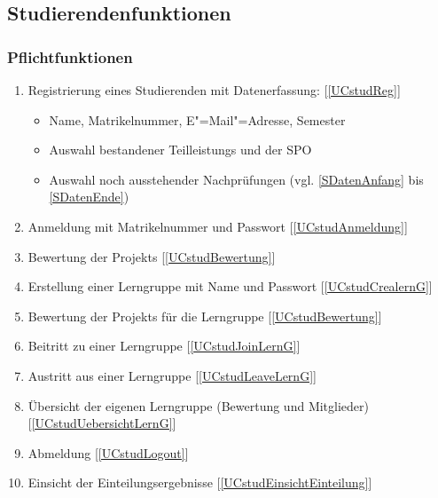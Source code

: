 \documentclass[parskip=full]{scrartcl}
\newcommand{\swtLabel}[1]{\textbf{/#1\arabic*0/}}
\newcommand{\testRef}[1]{[\ref{#1}]}
\begin{document}
\subsection{Studierendenfunktionen}

\subsubsection{Pflichtfunktionen}

\begin{enumerate}[label=\swtLabel{FA}]
  \item Registrierung eines Studierenden mit Datenerfassung: \testRef{UCstudReg}
  \label{FAregistrierung}
  \begin{itemize}
    \item Name, Matrikelnummer, E"=Mail"=Adresse, Semester
    \item Auswahl bestandener \glspl{Teilleistung} und der \gls{SPO}
    \item Auswahl noch ausstehender Nachprüfungen (vgl. \ref{SDatenAnfang} bis \ref{SDatenEnde})
  \end{itemize}
  \item Anmeldung mit Matrikelnummer und Passwort\label{FAStudanmeldung}
  \testRef{UCstudAnmeldung}
  \item Bewertung der \glspl{Projekt} \label{FAbewertung} \testRef{UCstudBewertung}
  \item Erstellung einer \gls{Lerngruppe} mit Name und Passwort
  \label{FAcreatelerng} \testRef{UCstudCrealernG}
  \item Bewertung der \glspl{Projekt} für die \gls{Lerngruppe} 
  \label{FAbewertung2} \testRef{UCstudBewertung}
  \item Beitritt zu einer \gls{Lerngruppe} \label{FAjoinLerng}
  \testRef{UCstudJoinLernG}
  \item Austritt aus einer \gls{Lerngruppe} \label{FAlergAustritt}
  \testRef{UCstudLeaveLernG}
  \item Übersicht der eigenen \gls{Lerngruppe} (Bewertung und Mitglieder)
  \label{FAcheckLerng} \testRef{UCstudUebersichtLernG}
  \item Abmeldung \label{FAStudabmeldung} \testRef{UCstudLogout}
  \item Einsicht der Einteilungsergebnisse \label{FAStudeinsicht} \testRef{UCstudEinsichtEinteilung}
\end{enumerate}
\end{document}

